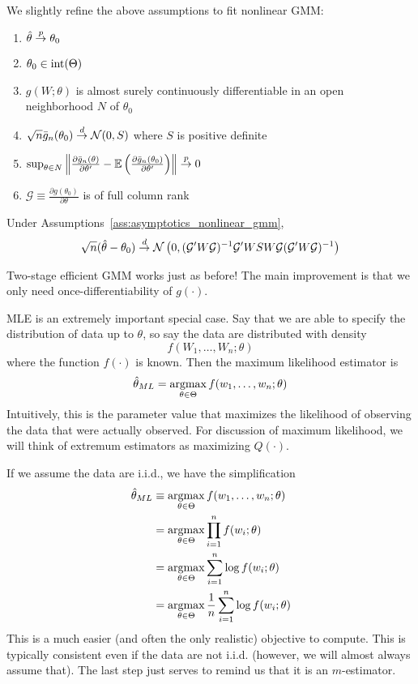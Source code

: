 \documentclass[10pt]{article}
\begin{document}
\begin{assumption}\label{ass:asymptotics_nonlinear_gmm}
	We slightly refine the above assumptions to fit nonlinear GMM:
	\begin{enumerate}
		\item $\hat{\theta} \overset{p}{\to} \theta_0$
		\item $\theta_0 \in \mathop{\rm int}(\Theta)$
		\item $g(W;\theta)$ is almost surely continuously differentiable in an open neighborhood $N$ of $\theta_0$
		\item $\sqrt{n} \bar{g}_n(\theta_0) \overset{d}{\to} \mathcal{N}(0,S)$ where $S$ is positive definite
		\item $\sup_{\theta\in N}\left\| \frac{\partial \bar{g}_n(\theta)}{\partial \theta'} - \mathbb{E} \left(  \frac{\partial \bar{g}_n(\theta_0)}{\partial \theta'}\right) \right\| \overset{p}{\to} 0$
		\item $\mathcal{G} \equiv \frac{\partial g(\theta_0)}{\partial \theta}$ is of full column rank
	\end{enumerate}
\end{assumption}
\begin{theorem}
	 Under Assumptions~\ref{ass:asymptotics_nonlinear_gmm},
	\[
	\sqrt{n} (\hat{\theta} - \theta_0) \overset{d}{\to} \mathcal{N}\left(0,(\mathcal{G}'W\mathcal{G})^{-1}\mathcal{G}'WSW\mathcal{G}(\mathcal{G}'W\mathcal{G})^{-1}\right)
	\]
\end{theorem}
\begin{remark}
	Two-stage efficient GMM works just as before! The main improvement is that we only need once-differentiability of $g(\cdot)$.
\end{remark}

\begin{example}
	 MLE is an extremely important special case. Say that we are able to specify the distribution of data up to $\theta$, so say the data are distributed with density \[f(W_1,\dots,W_n;\theta)\]where the function $f(\cdot)$ is known. Then the maximum likelihood estimator is \[\hat{\theta}_{ML} = \mathop{\rm argmax}_{\theta\in\Theta} f(w_1,\dots,w_n;\theta)  \]Intuitively, this is the parameter value that maximizes the likelihood of observing the data that were actually observed. For discussion of maximum likelihood, we will think of extremum estimators as maximizing $Q(\cdot)$. 
	
	If we assume the data are i.i.d., we have the simplification 
	\begin{align*}
		\hat{\theta}_{ML} &\equiv \mathop{\rm argmax}_{\theta\in\Theta} f(w_1,\dots,w_n;\theta) \\
		&= \mathop{\rm argmax}_{\theta\in\Theta} \prod_{i=1}^n f(w_i;\theta) \\
		&= \mathop{\rm argmax}_{\theta\in\Theta} \sum_{i=1}^n \log f(w_i;\theta) \\
		&= \mathop{\rm argmax}_{\theta\in\Theta} \frac{1}{n} \sum_{i=1}^n \log f(w_i;\theta)
	\end{align*}
	This is a much easier (and often the only realistic) objective to compute. This is typically consistent even if the data are not i.i.d. (however, we will almost always assume that). The last step just serves to remind us that it is an $m$-estimator.
\end{example}
\end{document}
